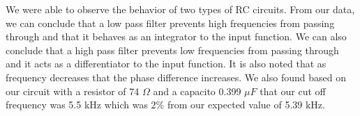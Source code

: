 \documentclass[11pt,letterpaper,onecolumn]{article}
\begin{document}
We were able to observe the behavior of two types of RC circuits. From our data, we can conclude that a low pass filter prevents high frequencies from passing through and that it behaves as an integrator to the input function. We can also conclude that a high pass filter prevents low frequencies from passing through and it acts as a differentiator to the input function. It is also noted that as frequency decreases that the phase difference increases. We also found based on our circuit with a resistor of 74 $\Omega$ and a capacito 0.399 $\mu F$ that our cut off frequency was 5.5 kHz which was $2\%$ from our expected value of 5.39 kHz. 





\end{document}
